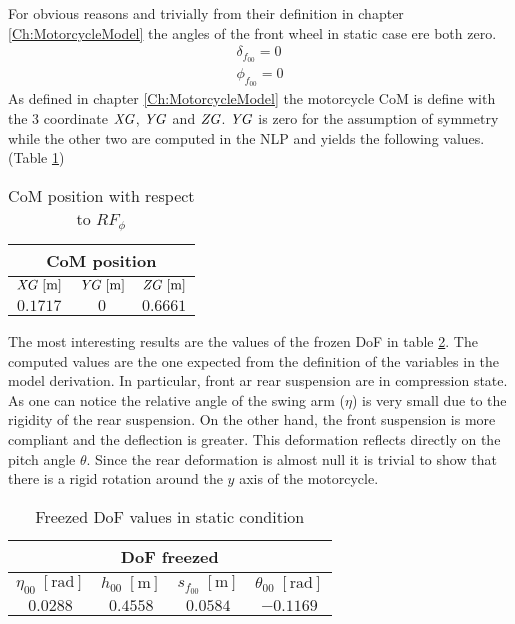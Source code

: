 For obvious reasons and trivially from their definition in chapter \ref{Ch:MotorcycleModel} the angles of the front wheel in static case ere both zero.
%
\begin{equation*}
    \begin{array}{l}
        \delta_{f_{00}}=0\\
        \phi_{f_{00}}=0
    \end{array}
\end{equation*}
%
As defined in chapter \ref{Ch:MotorcycleModel} the motorcycle CoM is define with the 3 coordinate ${\it XG}$, ${\it YG}$ and ${\it ZG}$. ${\it YG}$ is zero for the assumption of symmetry while the other two are computed in the NLP and yields the following values.(Table \ref{tab:CoMPosition})

%
\begin{table}[h!]
    \centering
    \begin{tabular}{@{}ccc@{}}
    \toprule
    \multicolumn{3}{c}{\textbf{CoM position}} \\ \midrule
    ${\it XG} \; [\si{\metre}]$ & ${\it YG} \; [\si{\metre}]$ & ${\it ZG} \; [\si{\metre}]$ \\
    $0.1717$              &  $0$                  & $0.6661$              \\ \bottomrule
    \end{tabular}
    \caption{CoM position with respect to $RF_\phi$}
    \label{tab:CoMPosition}
\end{table}
%

The most interesting results are the values of the frozen DoF in table \ref{tab:DoFFreezed}. The computed values are the one expected from the definition of the variables in the model derivation. In particular, front ar rear suspension are in compression state. As one can notice the relative angle of the swing arm ($\eta$) is very small due to the rigidity of the rear suspension. On the other hand, the front suspension is more compliant and the deflection is greater. This deformation reflects directly on the pitch angle $\theta$. Since the rear deformation is almost null it is trivial to show that there is a rigid rotation around the $y$ axis of the motorcycle.

%
\begin{table}[h!]
    \centering
    \begin{tabular}{@{}cccc@{}}
    \toprule
    \multicolumn{4}{c}{\textbf{DoF freezed}} \\ \midrule
    $\eta_{00} \; [\si{\radian}]$ & $h_{00} \; [\si{\metre}]$ & $s_{f_{00}} \; [\si{\metre}]$ &  $\theta_{00} \; [\si{\radian}]$ \\
    $0.0288  $ & $0.4558  $ & $0.0584  $ & $-0.1169 $ \\ \bottomrule
    \end{tabular}
    \caption{Freezed DoF values in static condition}
    \label{tab:DoFFreezed}
\end{table}
%

